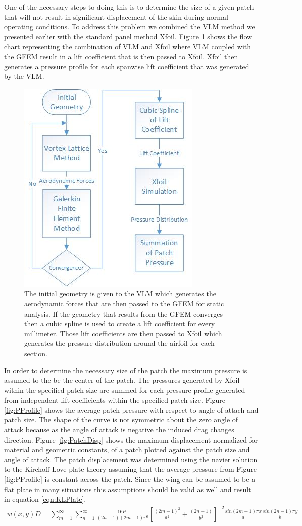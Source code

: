 \documentclass[11pt]{ucthesis}
\begin{document}
One of the necessary steps to doing this is to determine the size of a given patch that will not result in significant displacement of the skin during normal operating conditions. To address this problem we combined the VLM method we presented earlier with the standard panel method Xfoil. Figure \ref{fig:PPFlow} shows the flow chart representing the combination of VLM and Xfoil where VLM coupled with the GFEM result in a lift coefficient that is then passed to Xfoil. Xfoil then generates a pressure profile for each spanwise lift coefficient that was generated by the VLM.
\begin{figure}[h]
\centering
\includegraphics[width=0.3\linewidth]{Figures/PatchPressureFlowChart.jpg}
\caption{The initial geometry is given to the VLM which generates the aerodynamic forces that are then passed to the GFEM for static analysis. If the geometry that results from the GFEM converges then a cubic spline is used to create a lift coefficient for every millimeter. Those lift coefficients are then passed to Xfoil which generates the pressure distribution around the airfoil for each section.}
\label{fig:PPFlow}
\end{figure}

In order to determine the necessary size of the patch the maximum pressure is assumed to the be the center of the patch. The pressures generated by Xfoil  within the specified patch size are summed for each pressure profile generated from independent lift coefficients within the specified patch size. Figure \ref{fig:PProfile} shows the average patch pressure with respect to angle of attach and patch size. The shape of the curve is not symmetric about the zero angle of attack because as the angle of attack is negative the induced drag changes direction. Figure \ref{fig:PatchDisp} shows the maximum displacement normalized for material and geometric constants, of a patch plotted against the patch size and angle of attack. The patch displacement was determined using the navier solution to the Kirchoff-Love plate theory assuming that the average pressure from Figure \ref{fig:PProfile} is constant across the patch. Since the wing can be assumed to be a flat plate in many situations this assumptions should be valid as well and result in equation \ref{eqn:KLPlate}.
\small
\begin{eqnarray}
w(x,y)D = \sum_{m=1}^{\infty}\sum_{n=1}^{\infty}\frac{16P_0}{(2n-1)(2m-1)\pi^6}\left[\frac{(2m-1)^2}{a^2}+\frac{(2n-1)}{b^2}\right]^{-2}\frac{sin(2m-1)\pi x}{a}\frac{sin(2n-1)\pi y}{b}
\label{eqn:KLPlate}
\end{eqnarray}
\normalsize
\end{document}
